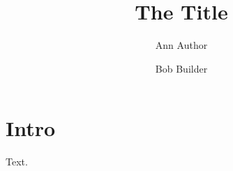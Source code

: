 \documentclass{article}
\title{The Title}\author{Ann Author}
\begin{document}
\begin{center}\@author\end{center}
\author{Bob Builder}
\begin{center}\@author\end{center}
\maketitle
\section{Intro}
Text.
\end{document}
